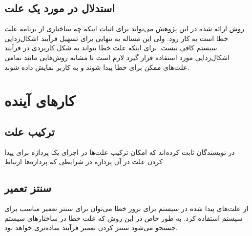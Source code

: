 \subsection{استدلال در مورد یک علت}
روش ارائه شده در این پژوهش می‌تواند برای اثبات اینکه چه ساختاری از برنامه علت خطا است به کار رود. 
ولی این مساله به تنهایی برای تسهیل فرآیند اشکال‌زدایی سیستم کافی نیست.
برای اینکه علت خطا بتواند به شکل کاربردی در فرآیند اشکال‌زدایی مورد استفاده قرار گیرد لازم است تا مشابه روش‌هایی مانند
\cite{chockler}
تمامی علت‌های ممکن برای خطا پیدا شوند و به کاربر نمایش داده شوند.

\section{کار‌های آینده}

\subsection{ترکیب علت}
در 
\cite{causal-hml}
نویسندگان ثابت کرده‌اند که امکان ترکیب علت‌ها در اجزای یک پردازه برای پیدا کردن علت در آن پردازه در شرایطی که پردازه‌ها ارتباط 


\subsection{سنتز تعمیر}
از علت‌های پیدا شده در سیستم برای بروز خطا می‌توان برای سنتز تعمیر مناسب برای سیستم استفاده کرد.
به طور خاص در این روش که علت خطا در ساختار‌های سیستم جستجو می‌شود سنتز کردن تعمیر فرآیند ساده‌تری خواهد بود.
